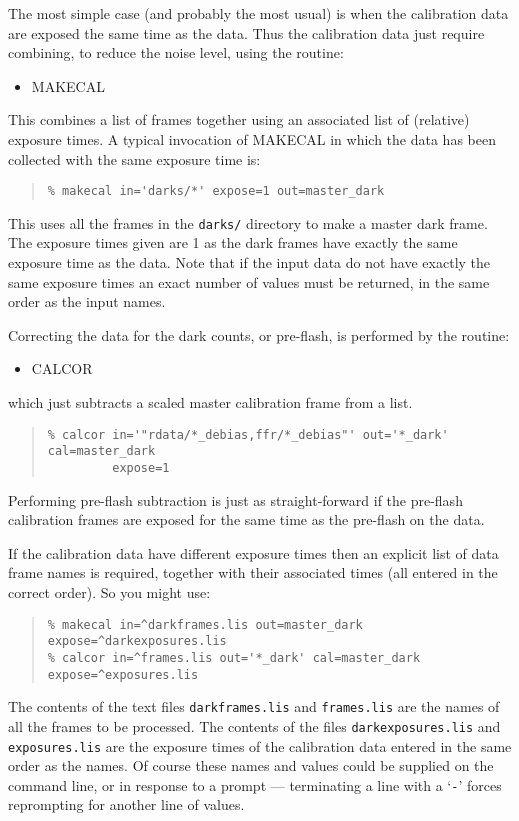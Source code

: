\documentclass[twoside,11pt]{article}
\newcommand{\htmlref}[2]{#1}
\renewcommand{\_}{\texttt{\symbol{95}}}
\newenvironment{myquote}{\begin{quote}\begin{small}}{\end{small}\end{quote}}
\newcommand{\text}[1]{{\small \tt #1}}
\newcommand{\routine}[1]{{\sc #1}}
\newcommand{\xroutine}[1]{\htmlref{{\sc #1}}{#1}}
\begin{document}
The most simple case (and probably the most usual) is when the
calibration data are exposed the same time as the data. Thus the
calibration data just require combining, to reduce the noise level,
using the routine:
\begin{itemize}
\item \xroutine{MAKECAL}
\end{itemize}
This combines a list of frames together using an associated list
of (relative) exposure times. A typical invocation of \routine{MAKECAL} in which
the data has been collected with the same exposure time is:
\begin{myquote}
\begin{verbatim}
% makecal in='darks/*' expose=1 out=master_dark
\end{verbatim}
\end{myquote}
This uses all the frames in the \text{darks/} directory to make a
master dark frame. The exposure times given are 1 as the dark frames
have exactly the same exposure time as the data. Note that if the input
data do not have exactly the same exposure times an exact number of
values must be returned, in the same order as the input names.

Correcting the data for the dark counts, or pre-flash, is performed by
the routine:
\begin{itemize}
\item \xroutine{CALCOR}
\end{itemize}
which just subtracts a scaled master calibration frame from a list.
\begin{myquote}
\begin{verbatim}
% calcor in='"rdata/*_debias,ffr/*_debias"' out='*_dark' cal=master_dark
         expose=1
\end{verbatim}
\end{myquote}

Performing pre-flash subtraction is just as straight-forward if the
pre-flash calibration frames are exposed for the same time as the
pre-flash on the data.

If the calibration data have different exposure times then an explicit
list of data frame names is required, together with their associated
times (all entered in the correct order). So you might use:
\begin{myquote}
\begin{verbatim}
% makecal in=^darkframes.lis out=master_dark expose=^darkexposures.lis
% calcor in=^frames.lis out='*_dark' cal=master_dark expose=^exposures.lis
\end{verbatim}
\end{myquote}
The contents of the text files \text{darkframes.lis} and
\text{frames.lis} are the names of all the frames to be
processed. The contents of the files \text{darkexposures.lis} and
\text{exposures.lis}  are the exposure times of the calibration
data entered in the same order as the names. Of course these names and
values could be supplied on the command line, or in response to a
prompt --- terminating a line with a `\text{-}' forces reprompting
for another line of values.
\end{document}
